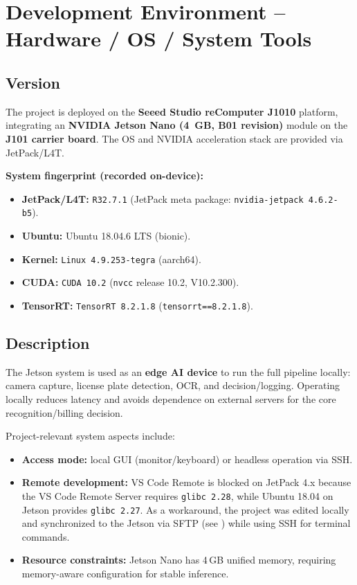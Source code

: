 %
%
%

\chapter{Development Environment -- Hardware / OS / System Tools}

\section{Version}
\noindent
The project is deployed on the \textbf{Seeed Studio reComputer J1010} platform, integrating an \textbf{NVIDIA Jetson Nano (4~GB, B01 revision)} module on the \textbf{J101 carrier board}.
The OS and NVIDIA acceleration stack are provided via JetPack/L4T.

\vspace{1mm}
\noindent
\textbf{System fingerprint (recorded on-device):}
\begin{itemize}
	\item \textbf{JetPack/L4T:} \texttt{R32.7.1} (JetPack meta package: \texttt{nvidia-jetpack 4.6.2-b5}).
	\item \textbf{Ubuntu:} Ubuntu 18.04.6 LTS (bionic).
	\item \textbf{Kernel:} \texttt{Linux 4.9.253-tegra} (aarch64).
	\item \textbf{CUDA:} \texttt{CUDA 10.2} (\texttt{nvcc} release 10.2, V10.2.300).
	\item \textbf{TensorRT:} \texttt{TensorRT 8.2.1.8} (\texttt{tensorrt==8.2.1.8}).
\end{itemize}

\section{Description}
\noindent
The Jetson system is used as an \textbf{edge AI device} to run the full pipeline locally: camera capture, license plate detection, OCR, and decision/logging.
Operating locally reduces latency and avoids dependence on external servers for the core recognition/billing decision.

\vspace{1mm}
\noindent
Project-relevant system aspects include:
\begin{itemize}
	\item \textbf{Access mode:} local GUI (monitor/keyboard) or headless operation via SSH.
	\item \textbf{Remote development:} VS Code Remote is blocked on JetPack 4.x because the VS Code Remote Server requires \texttt{glibc 2.28}, while Ubuntu 18.04 on Jetson provides \texttt{glibc 2.27}. As a workaround, the project was edited locally and synchronized to the Jetson via SFTP (see ) while using SSH for terminal commands.
	\item \textbf{Resource constraints:} Jetson Nano has 4\,GB unified memory, requiring memory-aware configuration for stable inference.
\end{itemize}

